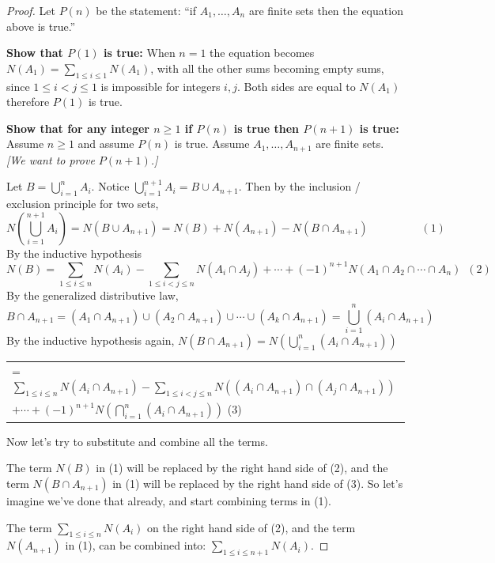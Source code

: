 \documentclass[14pt]{extarticle}
\newcommand{\dps}{\displaystyle}
\begin{document}
\begin{proof}
Let \(P(n)\) be the statement: ``if \(A_1, \ldots, A_n\) are finite sets then the equation above is true.''

{\bf Show that \(P(1)\) is true:} When \(n=1\) the equation becomes \(N(A_1) = \sum_{1 \leq i \leq 1} N(A_1)\), with 
all the other sums becoming empty sums, since \(1 \leq i < j \leq 1\) is impossible for integers $i,j$. Both sides are
equal to \(N(A_1)\) therefore $P(1)$ is true.

{\bf Show that for any integer \(n \geq 1\) if \(P(n)\) is true then \(P(n+1)\) is true:} Assume \(n \geq 1\) and 
assume \(P(n)\) is true. Assume \(A_1, \ldots, A_{n+1}\) are finite sets. {\it [We want to prove \(P(n+1)\).]}

Let \(B = \bigcup_{i=1}^n A_i\). Notice \(\bigcup_{i=1}^{n+1}A_i = B \cup A_{n+1}\). Then by the inclusion / exclusion principle for two sets,
\[
N\left(\bigcup_{i=1}^{n+1}A_i\right) = N(B \cup A_{n+1}) = N(B) + N(A_{n+1}) - N(B \cap A_{n+1}) \hspace{2cm} (1)
\]
By the inductive hypothesis
\[
N(B) = \sum_{1 \leq i \leq n} N(A_i) - \sum_{1 \leq i < j \leq n} N(A_i \cap A_j) + \cdots + (-1)^{n+1} N(A_1 \cap A_2 \cap \cdots \cap A_n) \,\,\, (2)
\]
By the generalized distributive law,
\[
B \cap A_{n+1} = (A_1 \cap A_{n+1}) \cup (A_2 \cap A_{n+1}) \cup \cdots \cup (A_k \cap A_{n+1}) = \bigcup_{i=1}^{n} 
(A_i \cap A_{n+1})
\]
By the inductive hypothesis again, \(N(B \cap A_{n+1}) = N\left(\bigcup_{i=1}^{n} (A_i \cap A_{n+1}) \right)\)
\begin{center}
\begin{tabular}{l}
= \(\dps \sum_{1 \leq i \leq n} N(A_i \cap A_{n+1}) - \sum_{1 \leq i < j \leq n} N((A_i \cap A_{n+1}) \cap 
(A_j \cap A_{n+1}))\) \\
\(\dps + \cdots + (-1)^{n+1}N\left(\bigcap_{i=1}^n (A_i \cap A_{n+1})\right)\) \hspace{4cm} (3)
\end{tabular}
\end{center}
Now let's try to substitute and combine all the terms. 

The term \(N(B)\) in (1) will be replaced by the right hand side of (2), and the term \(N(B \cap A_{n+1})\) in (1) will
be replaced by the right hand side of (3). So let's imagine we've done that already, and start combining terms in (1).

The term \(\dps \sum_{1 \leq i \leq n} N(A_i)\) on the right hand side of (2), and the term \(N(A_{n+1})\) in (1), 
can be combined into: \(\dps \sum_{1 \leq i \leq n+1} N(A_i)\).


\end{proof}
\end{document}
